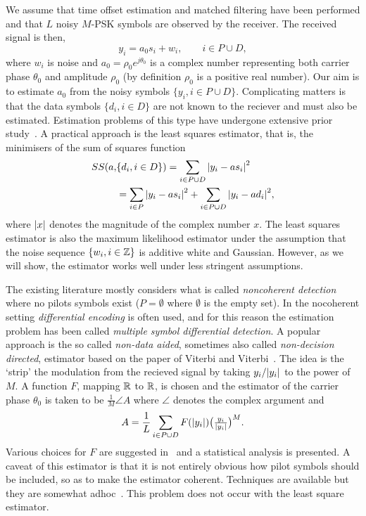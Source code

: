 \documentclass[journal]{IEEEtran}
\begin{document}
We assume that time offset estimation and matched filtering have been performed and that $L$ noisy $M$-PSK symbols are observed by the receiver.  The received signal is then,
\begin{equation}\label{eq:sigmod}
y_i = a_0 s_i + w_i, \qquad i \in P \cup D,
\end{equation}
where $w_i$ is noise and $a_0 = \rho_0 e^{j\theta_0}$ is a complex number representing both carrier phase $\theta_0$ and amplitude $\rho_0$ (by definition $\rho_0$ is a positive real number).  Our aim is to estimate $a_0$ from the noisy symbols $\{ y_i, i \in P \cup D \}$.  Complicating matters is that the data symbols $\{d_i, i \in D\}$ are not known to the reciever and must also be estimated.  Estimation problems of this type have undergone extensive prior study~\cite{ViterbiViterbi_phase_est_1983,Cowley_ref_sym_carr_1998,Wilson1989,Makrakis1990,Liu1991,Mackenthun1994,Sweldens2001,McKilliamLinearTimeBlockPSK2009}.  A practical approach is the least squares estimator, that is, the minimisers of the sum of squares function
\begin{align*}
SS(a, &\{d_i, i \in D\}) = \sum_{i \in P \cup D} {\left\vert  y_i - a s_i  \right\vert}^2 \\
&= \sum_{i \in P} {\left\vert  y_i - a s_i  \right\vert}^2 + \sum_{i \in P \cup D} {\left\vert  y_i - a d_i  \right\vert}^2,
\end{align*}
where ${\left\vert x \right\vert}$ denotes the magnitude of the complex number $x$.  The least squares estimator is also the maximum likelihood estimator under the assumption that the noise sequence $\{w_i, i \in {\mathbb Z}\}$ is additive white and Gaussian.  However, as we will show, the estimator works well under less stringent assumptions.  %

The existing literature mostly considers what is called \emph{noncoherent detection} where no pilots symbols exist ($P = \emptyset$ where $\emptyset$ is the empty set).  In the nocoherent setting \emph{differential encoding} is often used, and for this reason the estimation problem has been called \emph{multiple symbol differential detection}.  A popular approach is the so called \emph{non-data aided}, sometimes also called \emph{non-decision directed}, estimator based on the paper of Viterbi and Viterbi~\cite{ViterbiViterbi_phase_est_1983}.  The idea is the `strip' the modulation from the recieved signal by taking $y_i / {\left\vert y_i \right\vert}$ to the power of $M$.  A function $F$, mapping ${\mathbb R}$ to ${\mathbb R}$, is chosen and the estimator of the carrier phase $\theta_0$ is taken to be $\tfrac{1}{M}\angle{A}$ where $\angle$ denotes the complex argument and
\[
A = \frac{1}{L}\sum_{i \in P \cup D} F({\left\vert y_i \right\vert}) \big(\tfrac{y_i}{{\left\vert y_i \right\vert}}\big)^M.
\]
Various choices for $F$ are suggested in~\cite{ViterbiViterbi_phase_est_1983} and a statistical analysis is presented.  A caveat of this estimator is that it is not entirely obvious how pilot symbols should be included, so as to make the estimator coherent. Techniques are available but they are somewhat adhoc~\cite{Cowley_ref_sym_carr_1998}.  This problem does not occur with the least square estimator.
\end{document}

